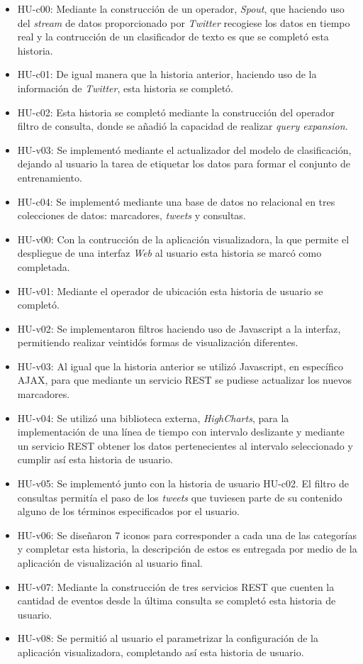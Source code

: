 \begin{itemize}
\item HU-c00: Mediante la construcción de un operador, \textit{Spout}, que haciendo uso del \textit{stream} de datos proporcionado por \textit{Twitter} recogiese los datos en tiempo real y la contrucción de un clasificador de texto es que se completó esta historia.
\item HU-c01: De igual manera que la historia anterior, haciendo uso de la información de \textit{Twitter}, esta historia se completó.
\item HU-c02: Esta historia se completó mediante la construcción del operador filtro de consulta, donde se añadió la capacidad de realizar \textit{query expansion}.
\item HU-v03: Se implementó mediante el actualizador del modelo de clasificación, dejando al usuario la tarea de etiquetar los datos para formar el conjunto de entrenamiento.
\item HU-c04: Se implementó mediante una base de datos no relacional en tres colecciones de datos: marcadores, \textit{tweets} y consultas.
\item HU-v00: Con la contrucción de la aplicación visualizadora, la que permite el despliegue de una interfaz \textit{Web} al usuario esta historia se marcó como completada.
\item HU-v01: Mediante el operador de ubicación esta historia de usuario se completó.
\item HU-v02: Se implementaron filtros haciendo uso de Javascript a la interfaz, permitiendo realizar veintidós formas de visualización diferentes.
\item HU-v03: Al igual que la historia anterior se utilizó Javascript, en específico AJAX, para que mediante un servicio REST se pudiese actualizar los nuevos marcadores.
\item HU-v04: Se utilizó una biblioteca externa, \textit{HighCharts}, para la implementación de una línea de tiempo con intervalo deslizante y mediante un servicio REST obtener los datos pertenecientes al intervalo seleccionado y cumplir así esta historia de usuario.
\item HU-v05: Se implementó junto con la historia de usuario HU-c02. El filtro de consultas permitía el paso de los \textit{tweets} que tuviesen parte de su contenido alguno de los términos especificados por el usuario.
\item HU-v06: Se diseñaron 7 iconos para corresponder a cada una de las categorías y completar esta historia, la descripción de estos es entregada por medio de la aplicación de visualización al usuario final.
\item HU-v07: Mediante la construcción de tres servicios REST que cuenten la cantidad de eventos desde la última consulta se completó esta historia de usuario.
\item HU-v08: Se permitió al usuario el parametrizar la configuración de la aplicación visualizadora, completando así esta historia de usuario.
\end{itemize}

